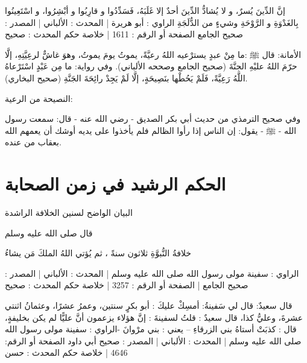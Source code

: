 إنَّ الدِّينَ يُسرٌ، و لا يُشادُّ الدِّينَ أحدٌ إلا غَلَبَهُ، فَسَدِّدُوا و قارِبُوا و أبْشِرُوا، و اسْتَعِينُوا بِالغَدْوَةِ و الرَّوْحَةِ وشيءٍ من الدُّلَجَةِ
الراوي : أبو هريرة | المحدث : الألباني | المصدر : صحيح الجامع
الصفحة أو الرقم : 1611 | خلاصة حكم المحدث : صحيح 


الأمانة:
قال ﷺ :ما مِنْ عبدٍ يسترْعيه اللهُ رعيَّةً، يموتُ يومَ يموتُ، وهوَ غاشٌّ لرعِيَّتِهِ، إلَّا حرّمَ اللهُ عليْهِ الجنَّةَ {\footnotesize (صحيح الجامع وصححه الألباني)}. وفي رواية: ما مِن عَبْدٍ اسْتَرْعاهُ اللَّهُ رَعِيَّةً، فَلَمْ يَحُطْها بنَصِيحَةٍ، إلَّا لَمْ يَجِدْ رائِحَةَ الجَنَّةِ {\footnotesize (صحيح البخاري)}.

النصيحة من الرعية: 

وفي صحيح الترمذي من حديث أبي بكر الصديق - رضي الله عنه - قال: سمعت رسول الله - ﷺ - يقول: إن الناس إذا رأوا الظالم فلم يأخذوا على يديه أوشك أن يعمهم الله بعقاب من عنده.

\section{الحكم الرشيد في زمن الصحابة}



البيان الواضح لسنين الخلافة الراشدة


قال صلى الله عليه وسلم 

خلافةُ النُّبوَّةِ ثلاثون سنةً ، ثم يُؤتي اللهُ الملكَ مَن يشاءُ

الراوي : سفينة مولى رسول الله صلى الله عليه وسلم | المحدث : الألباني | المصدر : صحيح الجامع | الصفحة أو الرقم : 3257 | خلاصة حكم المحدث : صحيح
   
قال سعيدٌ: قال لي سَفينةُ: أمسِكْ عليكَ : أبو بكرٍ سنتين، وعمرُ عشرًا، وعثمانُ اثنتي عشرةَ، وعليُّ كذا، قال سعيدٌ : قلتُ لسفينةَ : إنَّ هؤلاء يزعمون أنَّ عليًّا لم يكن بخليفةٍ، قال : كذبَتْ أستاهُ بني الزرقاءِ – يعني : بني مرْوانَ -الراوي : سفينة مولى رسول الله صلى الله عليه وسلم | المحدث : الألباني | المصدر : صحيح أبي داود
الصفحة أو الرقم: 4646 | خلاصة حكم المحدث : حسن

